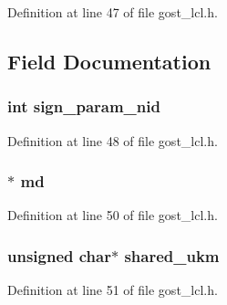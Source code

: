 Definition at line 47 of file gost\+\_\+lcl.\+h.



\subsection{Field Documentation}
\subsubsection[{\texorpdfstring{sign\+\_\+param\+\_\+nid}{sign_param_nid}}]{\setlength{\rightskip}{0pt plus 5cm}int sign\+\_\+param\+\_\+nid}\hypertarget{structgost__pmeth__data_a1d2fcf88413c158542b3febee6f210df}{}\label{structgost__pmeth__data_a1d2fcf88413c158542b3febee6f210df}


Definition at line 48 of file gost\+\_\+lcl.\+h.

\subsubsection[{\texorpdfstring{md}{md}}]{$\ast$ md}\hypertarget{structgost__pmeth__data_a53c8a7a6089e9083cf1822014950084d}{}\label{structgost__pmeth__data_a53c8a7a6089e9083cf1822014950084d}


Definition at line 50 of file gost\+\_\+lcl.\+h.

\subsubsection[{\texorpdfstring{shared\+\_\+ukm}{shared_ukm}}]{\setlength{\rightskip}{0pt plus 5cm}unsigned char$\ast$ shared\+\_\+ukm}\hypertarget{structgost__pmeth__data_a4a3eaf7e14ed79d59fcdd401db2f1b10}{}\label{structgost__pmeth__data_a4a3eaf7e14ed79d59fcdd401db2f1b10}


Definition at line 51 of file gost\+\_\+lcl.\+h.

